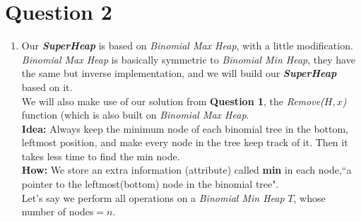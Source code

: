 \documentclass[10pt]{article}
\begin{document}
\section*{Question 2}
\begin{enumerate}
\item
Our \textbf{\textit{SuperHeap}} is based on \textit{Binomial Max Heap}, with a little modification.\\
\textit{Binomial Max Heap} is basically symmetric to \textit{Binomial Min Heap}, they have the same but inverse implementation, and we will build our \textbf{\textit{SuperHeap}} based on it.\\
We will also make use of our solution from \textbf{Question 1}, the \textit{Remove($H, x$)} function (which is also built on \textit{Binomial Max Heap}.\\
\textbf{Idea:} Always keep the minimum node of each binomial tree in the bottom, leftmost position, and make every node in the tree keep track of it. Then it takes less time to find the min node.\\
\textbf{How:} We store an extra information (attribute) called \textbf{min} in each node,``a pointer to the leftmost(bottom) node in the binomial tree".\\
Let's say we perform all operations on a \textit{Binomial Min Heap} $T$, whose number of nodes$=n$.



\end{enumerate}
\end{document}
